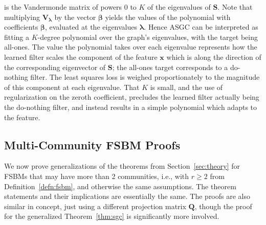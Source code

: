 \documentclass{article}
\begin{document}
is the Vandermonde matrix of powers $0$ to $K$ of the eigenvalues of $\bm{S}$. Note that multiplying $\bm{V_\lambda}$ by the vector $\bm{\beta}$ yields the values of the polynomial with coefficients $\bm{\beta}$, evaluated at the eigenvalues $\bm{\lambda}$.
Hence ASGC can be interpreted as fitting a $K$-degree polynomial over the graph's eigenvalues, with the target being all-ones. The value the polynomial takes over each eigenvalue represents how the learned filter scales the component of the feature $\bm{x}$ which is along the direction of the corresponding eigenvector of $\bm{S}$; the all-ones target corresponds to a do-nothing filter. The least squares loss is weighed proportionately to the magnitude of this component at each eigenvalue. That $K$ is small, and the use of regularization on the zeroth coefficient, precludes the learned filter actually being the do-nothing filter, and instead results in a simple polynomial which adapts to the feature.

\subsection{Multi-Community FSBM Proofs}\label{app:multicom_sbm}

We now prove generalizations of the theorems from Section~\ref{sec:theory} for FSBMs that may have more than 2 communities, i.e., with $r\geq 2$ from Definition~\ref{defn:fsbm}, and otherwise the same assumptions. The theorem statements and their implications are essentially the same. The proofs are also similar in concept, just using a different projection matrix $\bm{Q}$, though the proof for the generalized Theorem~\ref{thm:sgc} is significantly more involved.
\end{document}

